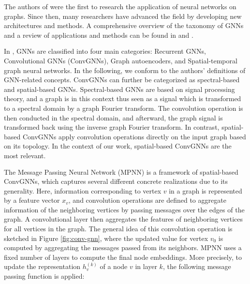 \documentclass[draft,final]{vutinfth} %
\begin{document}
The authors of \cite{Sperduti1997} were the first to research the application of neural networks on graphs. Since then, many researchers have advanced the field by developing new architectures and methods. 
A comprehensive overview of the taxonomy of GNNs and a review of applications and methods can be found in \cite{Wu2019} and \cite{Zhou2020}. 

In \cite{Wu2019}, GNNs are classified into four main categories: Recurrent GNNs, Convolutional GNNs (ConvGNNs), Graph autoencoders, and Spatial-temporal graph neural networks. In the following, we conform to the authors' definitions of GNN-related concepts. 
ConvGNNs can further be categorized as spectral-based and spatial-based GNNs. Spectral-based GNNs are based on signal processing theory, and a graph is in this context thus seen as a signal which is transformed to a spectral domain by a graph Fourier transform. The convolution operation is then conducted in the spectral domain, and afterward, the graph signal is transformed back using the inverse graph Fourier transform. 
In contrast, spatial-based ConvGNNs apply convolution operations directly on the input graph based on its topology. 
In the context of our work, spatial-based ConvGNNs are the most relevant. 


The Message Passing Neural Network (MPNN) \cite{GilmerSRVD17} is a framework of spatial-based ConvGNNs, which captures several different concrete realizations due to its generality. 
Here, information corresponding to vertex $v$ in a graph is represented by a feature vector $x_v$, and convolution operations are defined to aggregate information of the neighboring vertices by passing messages over the edges of the graph. A convolutional layer then aggregates the features of neighboring vertices for all vertices in the graph. The general idea of this convolution operation is sketched in Figure \ref{fig:conv-gnn}, 
where the updated value for vertex $v_0$ is computed by aggregating the messages passed from its neighbors. MPNN uses a fixed number of layers to compute the final node embeddings. 
More precisely, to update the representation $h_v^{(k)}$ of a node $v$ in layer $k$, the following message passing function is applied: 
\end{document}
